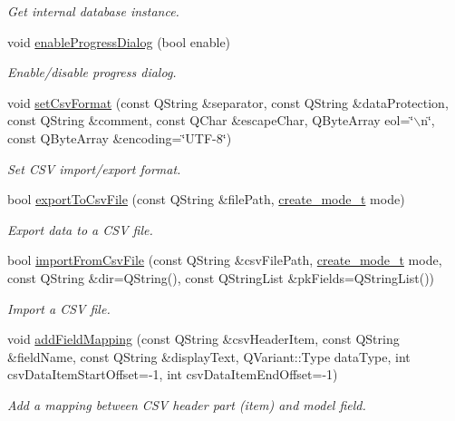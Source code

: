 \begin{DoxyCompactItemize}
\begin{DoxyCompactList}\small\item\em Get internal database instance. \end{DoxyCompactList}\item 
void \hyperlink{classmdt_data_table_manager_a139611cc21836438053226b1d7576201}{enableProgressDialog} (bool enable)
\begin{DoxyCompactList}\small\item\em Enable/disable progress dialog. \end{DoxyCompactList}\item 
void \hyperlink{classmdt_data_table_manager_a755ea0471525645157f4d4843b6a4e8a}{setCsvFormat} (const QString \&separator, const QString \&dataProtection, const QString \&comment, const QChar \&escapeChar, QByteArray eol=\char`\"{}$\backslash$n\char`\"{}, const QByteArray \&encoding=\char`\"{}UTF-\/8\char`\"{})
\begin{DoxyCompactList}\small\item\em Set CSV import/export format. \end{DoxyCompactList}\item 
bool \hyperlink{classmdt_data_table_manager_ac2da29f8f8920eed8cca78aa6cc0d8da}{exportToCsvFile} (const QString \&filePath, \hyperlink{classmdt_data_table_manager_a2bccf081737f3237ecdbe346dba559a8}{create\_\-mode\_\-t} mode)
\begin{DoxyCompactList}\small\item\em Export data to a CSV file. \end{DoxyCompactList}\item 
bool \hyperlink{classmdt_data_table_manager_aac9ba371ee9e6d111fb7544bb9241161}{importFromCsvFile} (const QString \&csvFilePath, \hyperlink{classmdt_data_table_manager_a2bccf081737f3237ecdbe346dba559a8}{create\_\-mode\_\-t} mode, const QString \&dir=QString(), const QStringList \&pkFields=QStringList())
\begin{DoxyCompactList}\small\item\em Import a CSV file. \end{DoxyCompactList}\item 
void \hyperlink{classmdt_data_table_manager_a2b38e6a8157183fcbce0770d12e9aa9d}{addFieldMapping} (const QString \&csvHeaderItem, const QString \&fieldName, const QString \&displayText, QVariant::Type dataType, int csvDataItemStartOffset=-\/1, int csvDataItemEndOffset=-\/1)
\begin{DoxyCompactList}\small\item\em Add a mapping between CSV header part (item) and model field. \end{DoxyCompactList}\item 

\end{DoxyCompactItemize}
